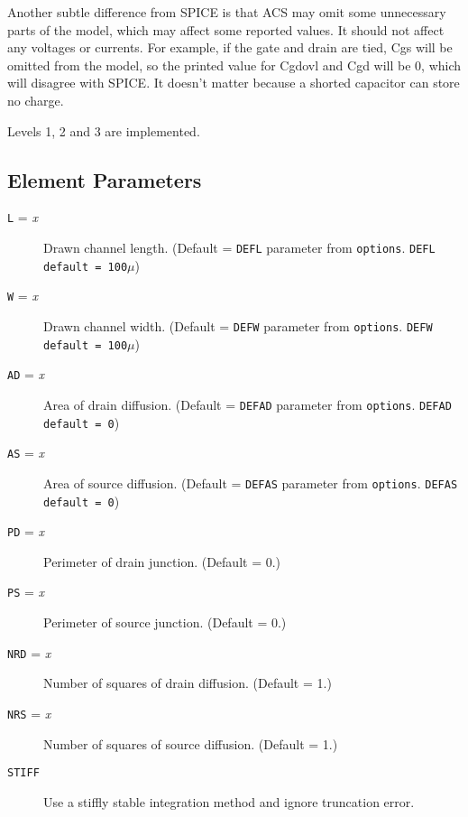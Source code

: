 Another subtle difference from SPICE is that ACS may omit some
unnecessary parts of the model, which may affect some reported
values.  It should not affect any voltages or currents.  For example,
if the gate and drain are tied, Cgs will be omitted from the model,
so the printed value for Cgdovl and Cgd will be 0, which will
disagree with SPICE.  It doesn't matter because a shorted capacitor
can store no charge.

Levels 1, 2 and 3 are implemented.
\subsection{Element Parameters}

\begin{description}

\item[{\tt L} = {\it x}] Drawn channel length.  (Default = {\tt DEFL}
parameter from {\tt options}. {\tt DEFL default = 100$\mu$})

\item[{\tt W} = {\it x}] Drawn channel width.  (Default = {\tt DEFW}
parameter from {\tt options}. {\tt DEFW default = 100$\mu$})

\item[{\tt AD} = {\it x}] Area of drain diffusion.  (Default = {\tt DEFAD}
parameter from {\tt options}. {\tt DEFAD default = 0})

\item[{\tt AS} = {\it x}] Area of source diffusion.  (Default = {\tt DEFAS}
parameter from {\tt options}. {\tt DEFAS default = 0})

\item[{\tt PD} = {\it x}] Perimeter of drain junction.  (Default = 0.)

\item[{\tt PS} = {\it x}] Perimeter of source junction.  (Default = 0.)

\item[{\tt NRD} = {\it x}] Number of squares of drain diffusion.  (Default =
1.)

\item[{\tt NRS} = {\it x}] Number of squares of source diffusion.  (Default =
1.)

\item[{\tt STIFF}] Use a stiffly stable integration method and
ignore truncation error.

\end{description}
